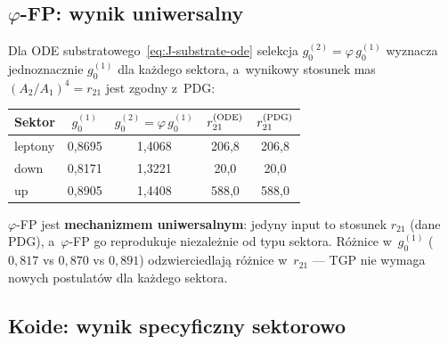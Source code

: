 \subsection{$\varphi$-FP: wynik uniwersalny}\label{app:X-phiFP}

\begin{result}%
\label{res:X-phiFP-universal}
Dla ODE substratowego~\eqref{eq:J-substrate-ode} selekcja
$g_0^{(2)} = \varphi\,g_0^{(1)}$ wyznacza jednoznacznie
$g_0^{(1)}$ dla ka\.zdego sektora, a~wynikowy stosunek mas
$(A_2/A_1)^4 = r_{21}$ jest zgodny z~PDG:
\begin{center}\footnotesize
\begin{tabular}{@{}lcccc@{}}
\toprule
  Sektor & $g_0^{(1)}$ & $g_0^{(2)} = \varphi\,g_0^{(1)}$
         & $r_{21}^{\rm (ODE)}$ & $r_{21}^{\rm (PDG)}$ \\
\midrule
  leptony & 0,8695 & 1,4068 & 206,8 & 206,8 \\
  down    & 0,8171 & 1,3221 & 20,0  & 20,0  \\
  up      & 0,8905 & 1,4408 & 588,0 & 588,0 \\
\bottomrule
\end{tabular}
\end{center}
\end{result}

\begin{remark}[Interpretacja]\label{rem:X-phiFP-interpretacja}
$\varphi$-FP jest \textbf{mechanizmem uniwersalnym}: jedyny input
to stosunek $r_{21}$ (dane PDG), a~$\varphi$-FP go reprodukuje
niezale\.znie od typu sektora.
R\'o\.znice w~$g_0^{(1)}$ ($0{,}817$ vs $0{,}870$ vs $0{,}891$)
odzwierciedlaj\k{a} r\'o\.znice w~$r_{21}$ --- TGP nie wymaga
nowych postulat\'ow dla ka\.zdego sektora.
\end{remark}

\subsection{Koide: wynik specyficzny sektorowo}\label{app:X-koide}


